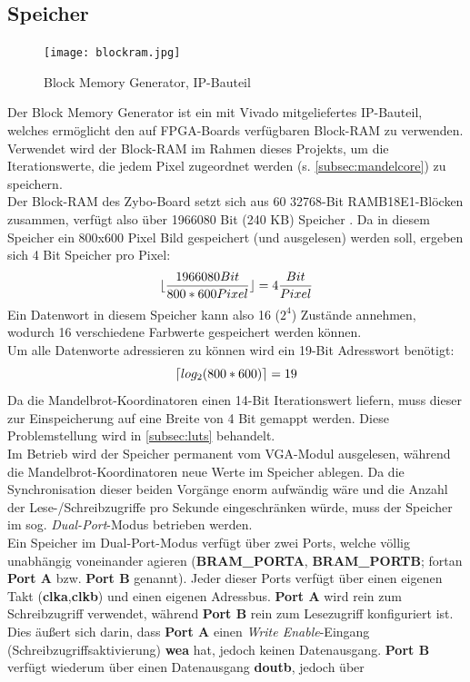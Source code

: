 \documentclass[a4paper,12pt,onesided]{report}
\begin{document}
\subsection{Speicher}
\label{subsec:ram}
\begin{figure}[H]
	\centering
	\texttt{[image: blockram.jpg]}
	\caption{Block Memory Generator, IP-Bauteil}
	\label{fig:schem:bram}
\end{figure}
Der Block Memory Generator ist ein mit Vivado %
mitgeliefertes IP-Bauteil, welches ermöglicht den auf FPGA-Boards verfügbaren Block-RAM zu verwenden.\\
Verwendet wird der Block-RAM im Rahmen dieses Projekts, um die Iterationswerte, die jedem Pixel zugeordnet werden (s. \autoref{subsec:mandelcore}) zu speichern.\\
Der Block-RAM des Zybo-Board setzt sich aus 60 32768-Bit RAMB18E1-Blöcken zusammen, verfügt also über 1966080 Bit (240 KB) Speicher \cite[S. 14]{bram} \cite{zyboref}.
Da in diesem Speicher ein 800x600 Pixel Bild gespeichert (und ausgelesen) werden soll, ergeben sich 4 Bit Speicher pro Pixel:
\[\lfloor\frac{1966080 Bit}{800*600 Pixel}\rfloor=4 \frac{Bit}{Pixel} \]
Ein Datenwort in diesem Speicher kann also 16 ($2^4$) Zustände annehmen, wodurch 16 verschiedene Farbwerte gespeichert werden können.\\
Um alle Datenworte adressieren zu können wird ein 19-Bit Adresswort benötigt:
\[\lceil log_2{(800*600)}\rceil=19\]
Da die Mandelbrot-Koordinatoren einen 14-Bit Iterationswert liefern, muss dieser zur Einspeicherung auf eine Breite von 4 Bit gemappt werden. Diese Problemstellung wird in \autoref{subsec:luts} behandelt.\\
Im Betrieb wird der Speicher permanent vom VGA-Modul ausgelesen, während die Mandelbrot-Koordinatoren neue Werte im Speicher ablegen. Da die Synchronisation dieser beiden Vorgänge enorm aufwändig wäre und die Anzahl der Lese-/Schreibzugriffe pro Sekunde eingeschränken würde, muss der Speicher im sog. \textit{Dual-Port}-Modus betrieben werden.\\
Ein Speicher im Dual-Port-Modus verfügt über zwei Ports, welche völlig unabhängig voneinander agieren (\textbf{BRAM\_PORTA}, \textbf{BRAM\_PORTB}; fortan \textbf{Port A} bzw. \textbf{Port B} genannt). 
Jeder dieser Ports verfügt über einen eigenen Takt (\textbf{clka},\textbf{clkb}) und einen eigenen Adressbus.
\textbf{Port A} wird rein zum Schreibzugriff verwendet, während \textbf{Port B} rein zum Lesezugriff konfiguriert ist. Dies äußert sich darin, dass \textbf{Port A} einen \textit{Write Enable}-Eingang (Schreibzugriffsaktivierung) \textbf{wea} hat, jedoch keinen Datenausgang. 
\textbf{Port B} verfügt wiederum über einen Datenausgang \textbf{doutb}, jedoch über %
\end{document}
